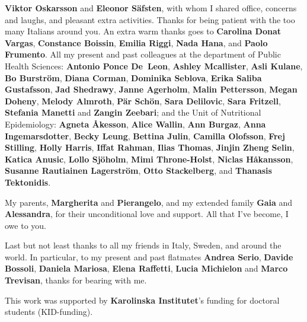 \textbf{Viktor Oskarsson} and \textbf{Eleonor Säfsten}, with whom I shared office, concerns and laughs, and pleasant extra activities. Thanks for being patient with the too many Italians around you. An extra warm thanks goes to \textbf{Carolina Donat Vargas}, \textbf{Constance Boissin}, \textbf{Emilia Riggi}, \textbf{Nada Hana}, and \textbf{Paolo Frumento}. All my present and past colleagues at the department of Public Health Sciences: \textbf{Antonio Ponce De~Leon}, \textbf{Ashley Mcallister}, \textbf{Asli Kulane}, \textbf{Bo Burström}, \textbf{Diana Corman}, \textbf{Dominika Seblova}, \textbf{Erika Saliba Gustafsson}, \textbf{Jad Shedrawy}, \textbf{Janne Agerholm}, \textbf{Malin Pettersson}, \textbf{Megan Doheny}, \textbf{Melody Almroth}, \textbf{Pär Schön}, \textbf{Sara Delilovic}, \textbf{Sara Fritzell}, \textbf{Stefania Manetti} and \textbf{Zangin Zeebari}; and the Unit of Nutritional Epidemiology: \textbf{Agneta Åkesson}, \textbf{Alice Wallin}, \textbf{Ann Burgaz}, \textbf{Anna Ingemarsdotter}, \textbf{Becky Leung}, \textbf{Bettina Julin}, \textbf{Camilla Olofsson}, \textbf{Frej Stilling}, \textbf{Holly Harris}, \textbf{Iffat Rahman}, \textbf{Ilias Thomas}, \textbf{Jinjin Zheng Selin}, \textbf{Katica Anusic}, \textbf{Lollo Sjöholm}, \textbf{Mimi Throne-Holst}, \textbf{Niclas Håkansson}, \textbf{Susanne Rautiainen Lagerström}, \textbf{Otto Stackelberg}, and \textbf{Thanasis Tektonidis}.
\medskip

My parents, \textbf{Margherita} and \textbf{Pierangelo}, and my extended family \textbf{Gaia} and \textbf{Alessandra}, for their unconditional love and support. All that I’ve become, I owe to you.
\medskip

Last but not least thanks to all my friends in Italy, Sweden, and around the world. In particular, to my present and past flatmates \textbf{Andrea Serio}, \textbf{Davide Bossoli}, \textbf{Daniela Mariosa}, \textbf{Elena Raffetti}, \textbf{Lucia Michielon} and
\textbf{Marco Trevisan}, thanks for bearing with me.



\vfill

\noindent This work was supported by \textbf{Karolinska Institutet}'s funding for doctoral students (KID-funding).





